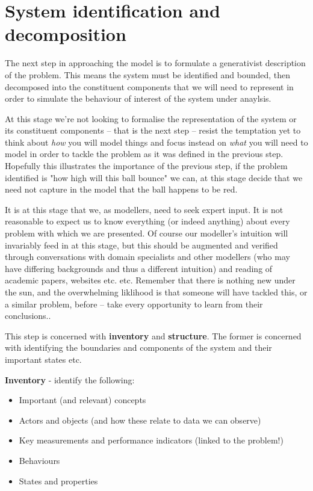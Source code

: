 \section{System identification and decomposition}

The next step in approaching the model is to formulate a generativist 
description of the problem. This means the system must be identified and bounded,
then decomposed into the constituent components that we will need to represent in
order to simulate the behaviour of interest of the system under anaylsis.

At this stage we're not looking to formalise the representation of the system
or its constituent components -- that is the next step -- resist the temptation
yet to think about \emph{how} you will model things and focus instead on 
\emph{what} you will need to model in order to tackle the problem as it was
defined in the previous step. Hopefully this illustrates the importance of
the previous step, if the problem identified is "how high will this ball bounce"
we can, at this stage decide that we need not capture in the model that the ball
happens to be red.

It is at this stage that we, as modellers, need to seek expert input. It is not
reasonable to expect us to know everything (or indeed anything) about every
problem with which we are presented. Of course our modeller's intuition will
invariably feed in at this stage, but this should be augmented and verified
through conversations with domain specialists and other modellers (who may
have differing backgrounds and thus a different intuition) and reading of 
academic papers, websites etc. etc. Remember that there is nothing new under the
sun, and the overwhelming liklihood is that someone will have tackled this, or
a similar problem, before -- take every opportunity to learn from their conclusions..

This step is concerned with \textbf{inventory} and \textbf{structure}. The former
is concerned with identifying the boundaries and components of the system and their 
important states etc. 

\textbf{Inventory} - identify the following:
\begin{itemize}
\item Important (and relevant) concepts
\item Actors and objects (and how these relate to data we can observe)
\item Key measurements and performance indicators (linked to the problem!)
\item Behaviours
\item States and properties
\end{itemize}

